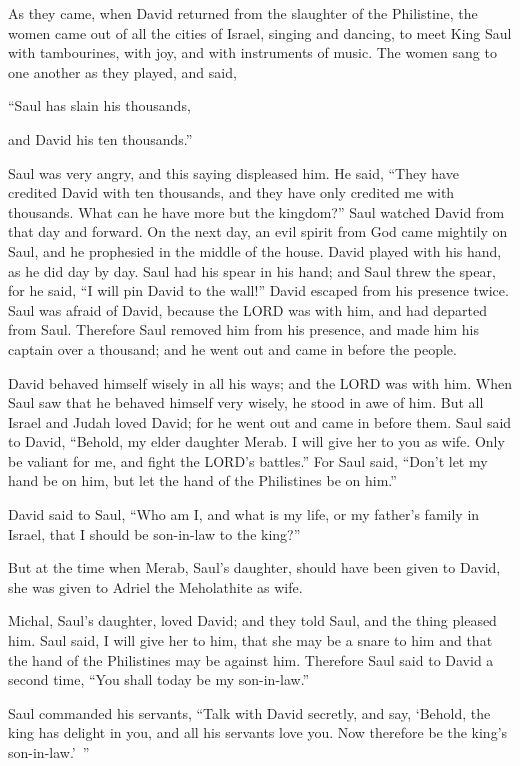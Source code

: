 \myverse{}As they came, when David returned from the slaughter of the Philistine,
the women came out of all the cities of Israel, singing and dancing, to meet King Saul with tambourines,
with joy, and with instruments of music.
\myverse{}The women sang to one another as they played, and said,

“Saul has slain his thousands,

and David his ten thousands.”

\myverse{}Saul was very angry, and this saying displeased him. He said,
“They have credited David with ten thousands, and they have only credited me with thousands. What can
he have more but the kingdom?”
\myverse{}Saul watched David from that day and forward.
\myverse{}On the next day, an evil spirit from God came mightily on Saul, and he prophesied
in the middle of the house. David played with his hand, as he did day by day. Saul had his spear in his
hand;
\myverse{}and Saul threw the spear, for he said, “I will pin David to the wall!” David
escaped from his presence twice.
\myverse{}Saul was afraid of David, because the LORD was with him, and had departed
from Saul.
\myverse{}Therefore Saul removed him from his presence, and made him his captain over
a thousand; and he went out and came in before the people.

\myverse{}David behaved himself wisely in all his ways; and the LORD was
with him.
\myverse{}When Saul saw that he behaved himself very wisely, he stood in awe of him.
\myverse{}But all Israel and Judah loved David; for he went out and came in before
them.
\myverse{}Saul said to David, “Behold, my elder daughter Merab. I will give her to
you as wife. Only be valiant for me, and fight the LORD’s battles.” For Saul said, “Don’t let my hand
be on him, but let the hand of the Philistines be on him.”

\myverse{}David said to Saul, “Who am I, and what is my life, or my father’s
family in Israel, that I should be son-in-law to the king?”

\myverse{}But at the time when Merab, Saul’s daughter, should have been
given to David, she was given to Adriel the Meholathite as wife.

\myverse{}Michal, Saul’s daughter, loved David; and they told Saul, and
the thing pleased him.
\myverse{}Saul said, I will give her to him, that she may be a snare to him and that
the hand of the Philistines may be against him. Therefore Saul said to David a second time, “You shall
today be my son-in-law.”

\myverse{}Saul commanded his servants, “Talk with David secretly, and
say, ‘Behold, the king has delight in you, and all his servants love you. Now therefore be the king’s
son-in-law.’ ”


